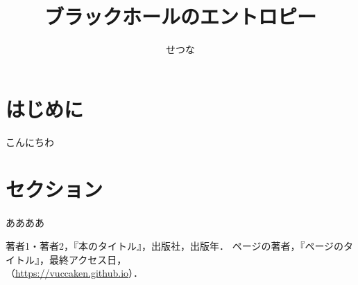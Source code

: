 \documentclass[uplatex,dvipdfmx]{vkaishi}
\begin{document}
\title{ブラックホールのエントロピー}%
\author[優木]{せつな}%

\maketitle %



\section*{はじめに}
こんにちわ


\section{セクション}
ああああ


\begin{thebibliography}{99}
   著者1・著者2，『本のタイトル』，出版社，出版年．
   ページの著者，『ページのタイトル』，最終アクセス日，\\（\url{https://vuccaken.github.io}）．
\end{thebibliography}
\end{document}
